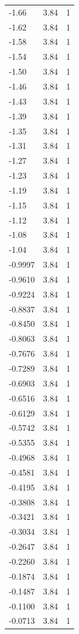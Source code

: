 \begin{longtable}{lrr}
  -1.66 & 3.84 & 1 \\
  -1.62 & 3.84 & 1 \\
  -1.58 & 3.84 & 1 \\
  -1.54 & 3.84 & 1 \\
  -1.50 & 3.84 & 1 \\
  -1.46 & 3.84 & 1 \\
  -1.43 & 3.84 & 1 \\
  -1.39 & 3.84 & 1 \\
  -1.35 & 3.84 & 1 \\
  -1.31 & 3.84 & 1 \\
  -1.27 & 3.84 & 1 \\
  -1.23 & 3.84 & 1 \\
  -1.19 & 3.84 & 1 \\
  -1.15 & 3.84 & 1 \\
  -1.12 & 3.84 & 1 \\
  -1.08 & 3.84 & 1 \\
  -1.04 & 3.84 & 1 \\
  -0.9997 & 3.84 & 1 \\
  -0.9610 & 3.84 & 1 \\
  -0.9224 & 3.84 & 1 \\
  -0.8837 & 3.84 & 1 \\
  -0.8450 & 3.84 & 1 \\
  -0.8063 & 3.84 & 1 \\
  -0.7676 & 3.84 & 1 \\
  -0.7289 & 3.84 & 1 \\
  -0.6903 & 3.84 & 1 \\
  -0.6516 & 3.84 & 1 \\
  -0.6129 & 3.84 & 1 \\
  -0.5742 & 3.84 & 1 \\
  -0.5355 & 3.84 & 1 \\
  -0.4968 & 3.84 & 1 \\
  -0.4581 & 3.84 & 1 \\
  -0.4195 & 3.84 & 1 \\
  -0.3808 & 3.84 & 1 \\
  -0.3421 & 3.84 & 1 \\
  -0.3034 & 3.84 & 1 \\
  -0.2647 & 3.84 & 1 \\
  -0.2260 & 3.84 & 1 \\
  -0.1874 & 3.84 & 1 \\
  -0.1487 & 3.84 & 1 \\
  -0.1100 & 3.84 & 1 \\
  -0.0713 & 3.84 & 1 \\

\end{longtable}
